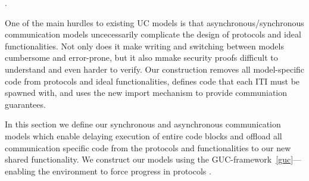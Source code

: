 



.





One of the main hurdles to existing UC models is that asynchronous/synchronous communication models uncecessarily complicate the design of protocols and ideal functionalities.
Not only does it make writing and switching between models cumbersome and error-prone, but it also mmake security proofs difficult to understand and even harder to verify.
Our construction removes all model-specific code from protocols and ideal functionalities, defines code that each ITI must be spawned with, and uses the new import mechanism to provide communiation guarantees.

In this section we define our synchronous and asynchronous communication models which enable delaying execution of entire code blocks and offload all communication specific code from the protocols and functionalities to our new shared functionality. 
We construct our models using the GUC-framework~\ref{guc}---enabling the environment to force progress in protocols .

